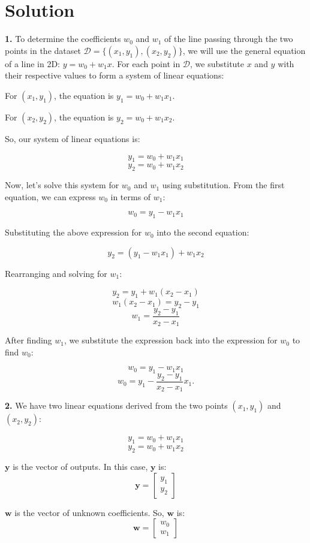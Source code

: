 \documentclass{harvardml}
\theoremstyle{definition}
\theoremstyle{plain}
\newenvironment{solution}
  {\color{blue}\section*{Solution}}
{}
\begin{document}
\begin{solution}
\color{black}

\noindent \textbf{1.}
To determine the coefficients \( w_0 \) and \( w_1 \) of the line passing through the two points in the dataset \( \mathcal{D} = \{ (x_1, y_1), (x_2, y_2) \} \), we will use the general equation of a line in 2D: \( y = w_0 + w_1 x \). 
For each point in \( \mathcal{D} \), we substitute \( x \) and \( y \) with their respective values to form a system of linear equations:
\medskip

For \( (x_1, y_1) \), the equation is \( y_1 = w_0 + w_1 x_1 \).
\smallskip

For  \( (x_2, y_2) \), the equation is \( y_2 = w_0 + w_1 x_2 \).

\medskip
So, our system of linear equations is:

\[ y_1 = w_0 + w_1 x_1 \]
\[ y_2 = w_0 + w_1 x_2 \]

Now, let's solve this system for \( w_0 \) and \( w_1 \) using substitution. From the first equation, we can express \( w_0 \) in terms of \( w_1 \):

\[ w_0 = y_1 - w_1 x_1 \]

Substituting the above expression for \( w_0 \) into the second equation:

\[ y_2 = (y_1 - w_1 x_1) + w_1 x_2 \]

Rearranging and solving for \( w_1 \):

\[ y_2 = y_1 + w_1 (x_2 - x_1) \]
\[ w_1 (x_2 - x_1) = y_2 - y_1 \]
\[ w_1 = \frac{y_2 - y_1}{x_2 - x_1} \]

After finding \( w_1 \), we substitute the expression back into the expression for \( w_0 \) to find \( w_0 \):

\[ w_0 = y_1 - w_1 x_1 \]
\[ w_0 = y_1 - \frac{y_2 - y_1}{x_2 - x_1} x_1 .\]

\bigskip
\noindent \textbf{2.}
We have two linear equations derived from the two points \((x_1, y_1)\) and \((x_2, y_2)\):

\[y_1 = w_0 + w_1 x_1\]
\[y_2 = w_0 + w_1 x_2\]

\(\mathbf{y}\) is the vector of outputs. In this case, \(\mathbf{y}\) is:
\[\mathbf{y} = \begin{bmatrix} y_1 \\ y_2 \end{bmatrix}\]

\(\mathbf{w}\) is the vector of unknown coefficients. So, \(\mathbf{w}\) is:
\[\mathbf{w} = \begin{bmatrix} w_0 \\ w_1 \end{bmatrix}\]


\end{solution}
\end{document}
